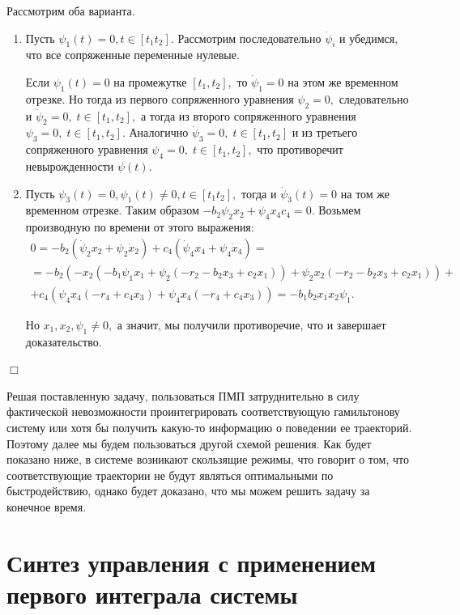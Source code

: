 \documentclass[11pt]{article}
\theoremstyle{definition}
\newenvironment{Proof}
{\par\noindent{\bf Доказательство.\\}} 
{\begin{flushright}$\Box$\end{flushright}}
\begin{document}
\begin{Proof}
    Рассмотрим оба варианта.
    \begin{enumerate}
    \item
        	Пусть $\psi_1(t) = 0, t \in [t_1 t_2].$ Рассмотрим последовательно $\dot \psi_i$ и убедимся, что все сопряженные переменные нулевые.
        
        Если $\psi_1(t) = 0$ на промежутке $[t_1, t_2],$ то $\dot \psi_1 = 0$ на этом же временном отрезке. Но тогда из первого сопряженного уравнения $\psi_2 = 0,$ следовательно и $\dot \psi_2 = 0, \;  t \in [t_1, t_2],$ а тогда из второго сопряженного уравнения $\psi_3 = 0, \;  t \in [t_1, t_2].$ Аналогично $\dot \psi_3 = 0, \;  t \in [t_1, t_2]$ и из третьего сопряженного уравнения $\psi_4 = 0, \;  t \in [t_1, t_2],$ что противоречит невырожденности $\psi(t).$
        
    \item
    	Пусть $\psi_3(t) = 0, \psi_1(t) \ne 0, t \in [t_1 t_2],$ тогда и $\dot \psi_3(t) = 0$ на том же временном отрезке. Таким образом $-b_2\psi_2x_2 + \psi_4x_4c_4 = 0.$ Возьмем производную по времени от этого выражения:
    	\begin{multline*}
    		0 = -b_2(\dot \psi_2x_2 + \psi_2 \dot x_2) + c_4(\dot \psi_4 x_4 + \psi_4 \dot x_4) = \\
    		= -b_2(-x_2(-b_1\psi_1x_1 + \psi_2(-r_2 - b_2x_3 + c_2x_1)) + \psi_2 x_2(-r_2 - b_2x_3 + c_2x_1)) + \\
    		+ c_4(\psi_4x_4(-r_4 + c_4x_3) + \psi_4x_4(-r_4 + c_4x_3)) = -b_1b_2x_1x_2\psi_1.
    	\end{multline*}
    	
    	Но $x_1, x_2, \psi_1 \ne 0,$ а значит, мы получили противоречие, что и завершает доказательство.
    
    \end{enumerate}    
\end{Proof}

	Решая поставленную задачу, пользоваться ПМП затруднительно в силу фактической невозможности проинтегрировать соответствующую гамильтонову систему или хотя бы получить какую-то информацию о поведении ее траекторий. Поэтому далее мы будем пользоваться другой схемой решения. Как будет показано ниже, в системе возникают скользящие режимы, что говорит о том, что соответствующие траектории не будут являться оптимальными по быстродействию, однако будет доказано, что мы можем решить задачу за конечное время.

\section{Синтез управления с применением первого интеграла системы}
\end{document}
